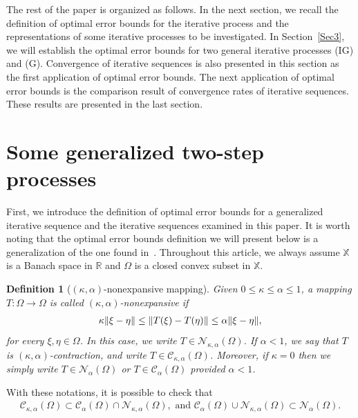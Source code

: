\documentclass[a4paper, 11pt]{article}
\newtheorem{definition}[theorem]{Definition}
\begin{document}
The rest of the paper is organized as follows. In the next section, we recall the definition of optimal error bounds for the iterative process and the representations of some iterative processes to be investigated. In Section~\ref{Sec3}, we will establish the optimal error bounds for two general iterative processes (IG) and (G). Convergence of iterative sequences is also presented in this section as the first application of optimal error bounds. The next application of optimal error bounds is the comparison result of convergence rates of iterative sequences. These results are presented in the last section. 

\newpage
\section{Some generalized two-step processes}\label{Sec2}

First, we introduce the definition of optimal error bounds for a generalized iterative sequence and the iterative sequences examined in this paper. It is worth noting that the optimal error bounds definition we will present below is a generalization of the one found in~\cite{paper2}. Throughout this article, we always assume $\mathbb{X}$ is a Banach space in $\mathbb{R}$ and $\Omega$ is a closed convex subset in  $\mathbb{X}$. 

\begin{definition}[$(\kappa,\alpha)$-nonexpansive mapping] Given $0 \le \kappa \le \alpha \le 1$, a mapping $T: \Omega \to \Omega$ is called $(\kappa,\alpha)$-nonexpansive if
\begin{align}\notag %
\kappa \|\xi-\eta\| \le \|T(\xi) - T(\eta)\| \le \alpha \|\xi-\eta\|, 
\end{align}
for every $\xi,\eta \in \Omega$. In this case, we write $T \in \mathcal{N}_{\kappa,\alpha}(\Omega)$. If $\alpha<1$, we say that $T$ is $(\kappa,\alpha)$-contraction, and write $T \in \mathcal{C}_{\kappa,\alpha}(\Omega)$. Moreover, if $\kappa=0$ then we simply write $T \in \mathcal{N}_{\alpha}(\Omega)$ or $T \in \mathcal{C}_{\alpha}(\Omega)$ provided $\alpha<1$.
\end{definition} 
With these notations, it is possible to check that 
\begin{align*}
\mathcal{C}_{\kappa,\alpha}(\Omega) \subset \mathcal{C}_{\alpha}(\Omega) \cap \mathcal{N}_{\kappa,\alpha}(\Omega),  \mbox{ and } \mathcal{C}_{\alpha}(\Omega) \cup \mathcal{N}_{\kappa,\alpha}(\Omega) \subset \mathcal{N}_{\alpha}(\Omega).
\end{align*}
\end{document}

